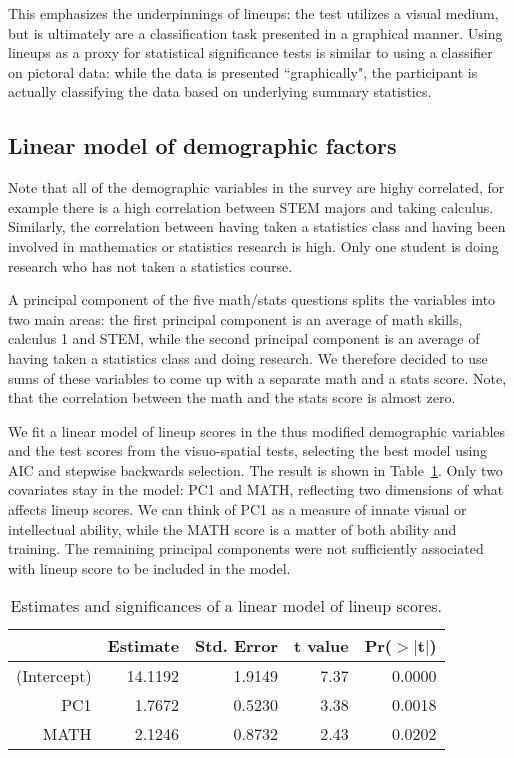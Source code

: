 \documentclass[journal]{vgtc}\usepackage[]{graphicx}\usepackage[]{color}
\begin{document}
This emphasizes the underpinnings of lineups: the test utilizes a visual medium, but is ultimately are a classification task presented in a graphical manner. Using lineups as a proxy for statistical significance tests is similar to using a classifier on pictoral data: while the data is presented ``graphically", the participant is actually classifying the data based on underlying summary statistics.

\subsection{Linear model of demographic factors}
Note that all of the demographic variables in the survey are highy correlated, for example there is a high correlation between STEM majors and taking calculus.
Similarly, the correlation  between having taken a statistics class and having been involved in mathematics or statistics research is high. Only one student is doing research who has not taken a statistics course. 

A principal component of the five math/stats questions splits the variables into two main areas: the first principal component is an average of math skills, calculus 1 and STEM, while the second principal component is an average of having taken a statistics class and doing research. We therefore decided to use sums of these variables to come up with a separate math and a stats score. Note, that the correlation between the math and the stats score is almost zero. 

We fit a linear model of lineup scores in the thus modified demographic variables and the test scores from the visuo-spatial tests, selecting the best model using AIC and stepwise backwards selection. The result is shown in Table~\ref{tab:m1}. Only two covariates stay in the model: PC1 and MATH, reflecting two dimensions of what affects lineup scores. We can think of PC1 as a measure of innate visual or intellectual ability, while the MATH score is a matter of both ability and training. The remaining principal components were not sufficiently associated with lineup score to be included in the model.

\begin{table}[ht]
\centering
\caption{Estimates and significances of a linear model of lineup scores.} 
\label{tab:m1}
\begin{tabular}{rrrrr}
  \hline
 & Estimate & Std. Error & t value & Pr($>$$|$t$|$) \\ 
  \hline
(Intercept) & 14.1192 & 1.9149 & 7.37 & 0.0000 \\ 
  PC1 & 1.7672 & 0.5230 & 3.38 & 0.0018 \\ 
  MATH & 2.1246 & 0.8732 & 2.43 & 0.0202 \\ 
   \hline
\end{tabular}
\end{table}
\end{document}
